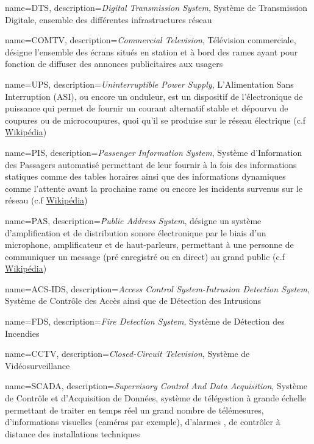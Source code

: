 {
	name=DTS,
	description={\textit{Digital Transmission System}, Système de Transmission Digitale, ensemble des différentes infrastructures réseau}
}

{
	name=COMTV,
	description={\textit{Commercial Television}, Télévision commerciale, désigne l'ensemble des écrans situés en station et à bord des rames ayant pour fonction de diffuser des annonces publicitaires aux usager}s
}

{
	name=UPS,
	description={\textit{Uninterruptible Power Supply}, L'Alimentation Sans Interruption (ASI), ou encore un onduleur, est un dispositif de l'électronique de puissance qui permet de fournir un courant alternatif stable et dépourvu de coupures ou de microcoupures, quoi qu'il se produise sur le réseau électrique (c.f \href{https://fr.wikipedia.org/wiki/Alimentation_sans_interruption}{Wikipédia})}
}


{
	name=PIS,
	description={\textit{Passenger Information System}, Système d'Information des Passagers automatisé permettant de leur fournir à la fois des informations statiques comme des tables horaires ainsi que des informations dynamiques comme l'attente avant la prochaine rame ou encore les incidents survenus sur le réseau (c.f \href{https://en.wikipedia.org/wiki/Passenger_information_system}{Wikipédia})}
}

{
	name=PAS,
	description={\textit{Public Address System}, désigne un système d'amplification et de distribution sonore électronique par le biais d'un microphone, amplificateur et de haut-parleurs, permettant à une personne de communiquer un message (pré enregistré ou en direct) au grand public (c.f \href{https://en.wikipedia.org/wiki/Public_address_system}{Wikipédia})}
}

{
	name=ACS-IDS,
	description={\textit{Access Control System-Intrusion Detection System}, Système de Contrôle des Accès ainsi que de Détection des Intrusions}
}

{
	name=FDS,
	description={\textit{Fire Detection System}, Système de Détection des Incendies}
}

{
	name=CCTV,
	description={\textit{Closed-Circuit Television}, Système de Vidéosurveillance}
}

{
	name=SCADA,
	description={\textit{Supervisory Control And Data Acquisition}, Système de Contrôle et d'Acquisition de Données, système de télégestion à grande échelle permettant de traiter en temps réel un grand nombre de télémesures, d'informations visuelles (caméras par exemple), d'alarmes , de contrôler à distance des installations techniques}
}

